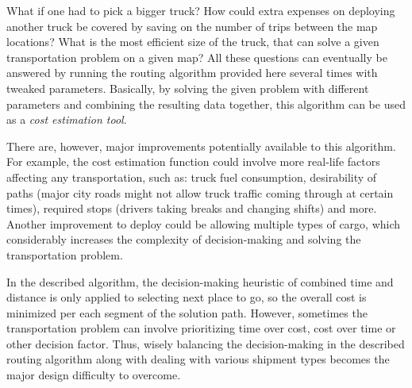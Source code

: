 \documentclass[journal,onecolumn]{IEEEtran}
\begin{document}
What if one had to pick a bigger truck? How could extra expenses on deploying another truck be covered by saving on the number of trips between the map locations? What is the most efficient size of the truck, that can solve a given transportation problem on a given map? All these questions can eventually be answered by running the routing algorithm provided here several times with tweaked parameters. Basically, by solving the given problem with different parameters and combining the resulting data together, this algorithm can be used as a \textit{cost estimation tool}.

There are, however, major improvements potentially available to this algorithm. For example, the cost estimation function could involve more real-life factors affecting any transportation, such as: truck fuel consumption, desirability of paths (major city roads might not allow truck traffic coming through at certain times), required stops (drivers taking breaks and changing shifts) and more. Another improvement to deploy could be allowing multiple types of cargo, which considerably increases the complexity of decision-making and solving the transportation problem.

In the described algorithm, the decision-making heuristic of combined time and distance is only applied to selecting next place to go, so the overall cost is minimized per each segment of the solution path. However, sometimes the transportation problem can involve prioritizing time over cost, cost over time or other decision factor. Thus, wisely balancing the decision-making in the described routing algorithm along with dealing with various shipment types becomes the major design difficulty to overcome. 








\end{document}
